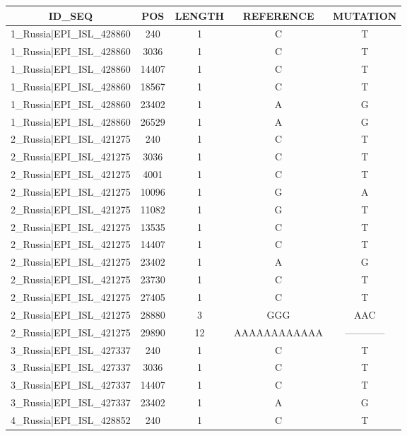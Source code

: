 \documentclass[a4paper,10pt]{article}
\begin{document}
\setlength\LTleft{-2.2 cm}
\begin{longtable}{@{}ccccc@{}}
\toprule
\textbf{ID\_SEQ} & \textbf{POS} & \textbf{LENGTH} & \textbf{REFERENCE} & \textbf{MUTATION} \\* \midrule
\endfirsthead
%
\cline{1-5}
\endhead
%
1\_Russia|EPI\_ISL\_428860 & 240 & 1 & C & T \\* \midrule
1\_Russia|EPI\_ISL\_428860 & 3036 & 1 & C & T \\* \midrule
1\_Russia|EPI\_ISL\_428860 & 14407 & 1 & C & T \\* \midrule
1\_Russia|EPI\_ISL\_428860 & 18567 & 1 & C & T \\* \midrule
1\_Russia|EPI\_ISL\_428860 & 23402 & 1 & A & G \\* \midrule
1\_Russia|EPI\_ISL\_428860 & 26529 & 1 & A & G \\* \midrule
2\_Russia|EPI\_ISL\_421275 & 240 & 1 & C & T \\* \midrule
2\_Russia|EPI\_ISL\_421275 & 3036 & 1 & C & T \\* \midrule
2\_Russia|EPI\_ISL\_421275 & 4001 & 1 & C & T \\* \midrule
2\_Russia|EPI\_ISL\_421275 & 10096 & 1 & G & A \\* \midrule
2\_Russia|EPI\_ISL\_421275 & 11082 & 1 & G & T \\* \midrule
2\_Russia|EPI\_ISL\_421275 & 13535 & 1 & C & T \\* \midrule
2\_Russia|EPI\_ISL\_421275 & 14407 & 1 & C & T \\* \midrule
2\_Russia|EPI\_ISL\_421275 & 23402 & 1 & A & G \\* \midrule
2\_Russia|EPI\_ISL\_421275 & 23730 & 1 & C & T \\* \midrule
2\_Russia|EPI\_ISL\_421275 & 27405 & 1 & C & T \\* \midrule
2\_Russia|EPI\_ISL\_421275 & 28880 & 3 & GGG & AAC \\* \midrule
2\_Russia|EPI\_ISL\_421275 & 29890 & 12 & AAAAAAAAAAAA & ------------ \\* \midrule
3\_Russia|EPI\_ISL\_427337 & 240 & 1 & C & T \\* \midrule
3\_Russia|EPI\_ISL\_427337 & 3036 & 1 & C & T \\* \midrule
3\_Russia|EPI\_ISL\_427337 & 14407 & 1 & C & T \\* \midrule
3\_Russia|EPI\_ISL\_427337 & 23402 & 1 & A & G \\* \midrule
4\_Russia|EPI\_ISL\_428852 & 240 & 1 & C & T \\* \midrule

\end{longtable}
\end{document}
